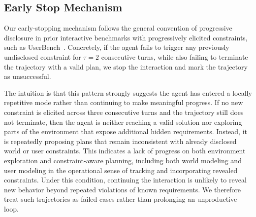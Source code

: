 \documentclass{llmxive}
\begin{document}
\subsection{Early Stop Mechanism}
\label{app:early-stop-discussion}

Our early-stopping mechanism follows the general convention of progressive disclosure in prior interactive benchmarks with progressively elicited constraints, such as UserBench~\citep{UserBench}. Concretely, if the agent fails to trigger any previously undisclosed constraint for $\tau=2$ consecutive turns, while also failing to terminate the trajectory with a valid plan, we stop the interaction and mark the trajectory as unsuccessful.

The intuition is that this pattern strongly suggests the agent has entered a locally repetitive mode rather than continuing to make meaningful progress. If no new constraint is elicited across three consecutive turns and the trajectory still does not terminate, then the agent is neither reaching a valid solution nor exploring parts of the environment that expose additional hidden requirements. Instead, it is repeatedly proposing plans that remain inconsistent with already disclosed world or user constraints. This indicates a lack of progress on both environment exploration and constraint-aware planning, including both world modeling and user modeling in the operational sense of tracking and incorporating revealed constraints. Under this condition, continuing the interaction is unlikely to reveal new behavior beyond repeated violations of known requirements. We therefore treat such trajectories as failed cases rather than prolonging an unproductive loop.


\end{document}

